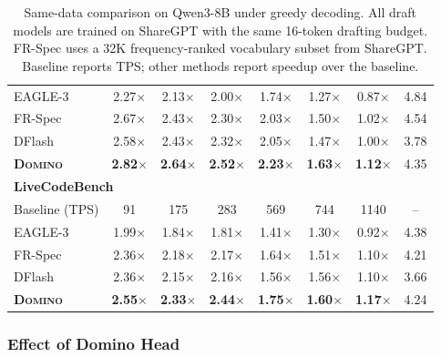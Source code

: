 \documentclass{llmxive}
\begin{document}
\begin{table}[t]
{\begin{tabular}{l cccccc c}
EAGLE-3
& 2.27$\times$ & 2.13$\times$ & 2.00$\times$ & 1.74$\times$ & 1.27$\times$ & 0.87$\times$
& 4.84 \\

FR-Spec
& 2.67$\times$ & 2.43$\times$ & 2.30$\times$ & 2.03$\times$ & 1.50$\times$ & 1.02$\times$
& 4.54 \\

DFlash
& 2.58$\times$ & 2.43$\times$ & 2.32$\times$ & 2.05$\times$ & 1.47$\times$ & 1.00$\times$
& 3.78 \\

\textbf{\textsc{Domino}}
& \textbf{2.82$\times$} & \textbf{2.64$\times$} & \textbf{2.52$\times$} & \textbf{2.23$\times$} & \textbf{1.63$\times$} & \textbf{1.12$\times$}
& 4.35 \\

\midrule
\multicolumn{8}{l}{\textbf{LiveCodeBench}} \\
\midrule
Baseline (TPS)
& 91 & 175 & 283 & 569 & 744 & 1140 & -- \\

EAGLE-3
& 1.99$\times$ & 1.84$\times$ & 1.81$\times$ & 1.41$\times$ & 1.30$\times$ & 0.92$\times$
& 4.38 \\

FR-Spec
& 2.36$\times$ & 2.18$\times$ & 2.17$\times$ & 1.64$\times$ & 1.51$\times$ & 1.10$\times$
& 4.21 \\

DFlash
& 2.36$\times$ & 2.15$\times$ & 2.16$\times$ & 1.56$\times$ & 1.56$\times$ & 1.10$\times$
& 3.66 \\

\textbf{\textsc{Domino}}
& \textbf{2.55$\times$} & \textbf{2.33$\times$} & \textbf{2.44$\times$} & \textbf{1.75$\times$} & \textbf{1.60$\times$} & \textbf{1.17$\times$}
& 4.24 \\

\bottomrule
\end{tabular}
}
\caption{Same-data comparison on Qwen3-8B under greedy decoding. All draft models are trained on ShareGPT with the same 16-token drafting budget. FR-Spec uses a 32K frequency-ranked vocabulary subset from ShareGPT. Baseline reports TPS; other methods report speedup over the baseline.}
\label{tab:same-data-abl}
\end{table}

\subsubsection{Effect of Domino Head}
\end{document}
